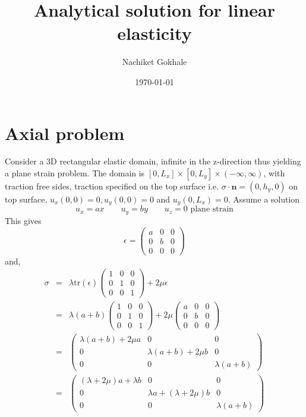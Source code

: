 \documentclass[12pt]{article}
\newcommand{\beq}{\begin{equation}}
\newcommand{\eeq}{\end{equation}}
\newcommand{\ber}{\begin{eqnarray}}
\newcommand{\eer}{\end{eqnarray}}
\begin{document}
\title{Analytical solution for linear elasticity}
\date{\today}
\author{Nachiket Gokhale}
\maketitle
\section{Axial problem}
Consider a 3D rectangular elastic domain, infinite in the z-direction thus yielding a plane strain problem. The domain is  $[0,L_x]\times[0,L_y]\times(-\infty,\infty)$, with traction free sides, traction specified on the top surface i.e. $\sigma\cdot{\mathbf{n}}=(0,h_y,0)$ on top surface, $u_x(0,0)=0,u_y(0,0)=0$ and $u_y(0,L_x)=0$. Assume a solution
\beq
u_x=ax \qquad u_y = by \qquad u_z = 0\,\, \text{plane strain}
\eeq
This gives
\beq
\epsilon = \begin{pmatrix}a & 0 & 0 \\ 0 & b & 0 \\ 0 & 0 & 0 \end{pmatrix}
\eeq
and,
\ber
\sigma &=& \lambda\text{tr}(\epsilon)\begin{pmatrix}1 & 0 & 0\\ 0 & 1 & 0\\0 & 0 & 1\end{pmatrix} + 2\mu\epsilon \\
  &=& \lambda(a+b)\begin{pmatrix}1 & 0 & 0\\ 0 & 1 & 0\\0 & 0 & 1\end{pmatrix} +  2\mu\begin{pmatrix}a & 0 & 0 \\ 0 & b & 0 \\ 0 & 0 & 0 \end{pmatrix} \\
  &=& \begin{pmatrix}\lambda(a+b)+2\mu{a} & 0 & 0 \\ 0 & \lambda(a+b)+2\mu{b} &0 \\ 0 & 0 & \lambda(a+b)\end{pmatrix}  \\
  &=& \begin{pmatrix} (\lambda+2\mu)a + \lambda{b}& 0 & 0\\0 & \lambda{a} + (\lambda+2\mu)b &0 \\ 0 & 0 & \lambda(a+b) \end{pmatrix} 
      \eer
      
\end{document}
